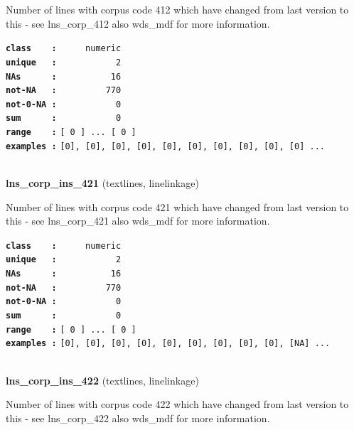 \documentclass[]{article}
\begin{document}
Number of lines with corpus code 412 which have changed from last
version to this - see lns\_corp\_412 also wds\_mdf for more information.

\textbf{\texttt{class\ \ \ \ :}} \texttt{~~~~~numeric}\\
\textbf{\texttt{unique\ \ \ :}} \texttt{~~~~~~~~~~~2}\\
\textbf{\texttt{NAs\ \ \ \ \ \ :}} \texttt{~~~~~~~~~~16}\\
\textbf{\texttt{not-NA\ \ \ :}} \texttt{~~~~~~~~~770}\\
\textbf{\texttt{not-0-NA\ :}} \texttt{~~~~~~~~~~~0}\\
\textbf{\texttt{sum\ \ \ \ \ \ :}} \texttt{~~~~~~~~~~~0}\\
\textbf{\texttt{range\ \ \ \ :}}
\texttt{{[}\ 0\ {]}\ ...\ {[}\ 0\ {]}}\\
\textbf{\texttt{examples\ :}}
\texttt{{[}0{]},\ {[}0{]},\ {[}0{]},\ {[}0{]},\ {[}0{]},\ {[}0{]},\ {[}0{]},\ {[}0{]},\ {[}0{]},\ {[}0{]}\ ...}\\

~

\textbf{lns\_corp\_ins\_421} (textlines, linelinkage)

Number of lines with corpus code 421 which have changed from last
version to this - see lns\_corp\_421 also wds\_mdf for more information.

\textbf{\texttt{class\ \ \ \ :}} \texttt{~~~~~numeric}\\
\textbf{\texttt{unique\ \ \ :}} \texttt{~~~~~~~~~~~2}\\
\textbf{\texttt{NAs\ \ \ \ \ \ :}} \texttt{~~~~~~~~~~16}\\
\textbf{\texttt{not-NA\ \ \ :}} \texttt{~~~~~~~~~770}\\
\textbf{\texttt{not-0-NA\ :}} \texttt{~~~~~~~~~~~0}\\
\textbf{\texttt{sum\ \ \ \ \ \ :}} \texttt{~~~~~~~~~~~0}\\
\textbf{\texttt{range\ \ \ \ :}}
\texttt{{[}\ 0\ {]}\ ...\ {[}\ 0\ {]}}\\
\textbf{\texttt{examples\ :}}
\texttt{{[}0{]},\ {[}0{]},\ {[}0{]},\ {[}0{]},\ {[}0{]},\ {[}0{]},\ {[}0{]},\ {[}0{]},\ {[}0{]},\ {[}NA{]}\ ...}\\

~

\textbf{lns\_corp\_ins\_422} (textlines, linelinkage)

Number of lines with corpus code 422 which have changed from last
version to this - see lns\_corp\_422 also wds\_mdf for more information.
\end{document}
